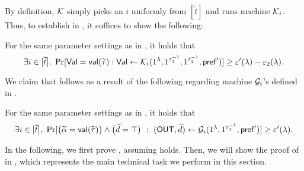 By definition, $\mathcal{K}$ simply picks an $i$ uniformly from $[\tilde{t}]$ and runs machine $\mathcal{K}_i$. Thus, to establish  in , it suffices to show the following: 
\begin{lemma}\label{pq:lem:bound:Ki}
    For the same parameter settings as in , it holds that 
    $$\exists i \in [\widetilde{t}], ~\Pr[\mathsf{Val} = \mathsf{val}(\widetilde{\tau}) :\mathsf{Val} \gets \mathcal{K}_i{(1^\lambda, 1^{\varepsilon_1^{-1}}, 1^{\varepsilon_2^{-1}}, \mathsf{pref}')}] \ge {\varepsilon'(\lambda) - \varepsilon_2(\lambda)}.$$ 
\end{lemma}
We claim that  follows as a result of the following  regarding machine $\mathcal{G}_i$'s defined in .
\begin{lemma}\label{pq:lem:bound:Gi}
    For the same parameter settings as in , it holds that 
$$
    \exists i \in [\tilde{t}],\ \Pr[\big(\tilde{\alpha} = \msf{val}( \tilde{\tau}) \big) \wedge \big(\tilde{d} = \top\big) ~:~(\OUT,\tilde{d}) \gets \mcal{G}_i{(1^\secpar, 1^{\epsilon_1^{-1}},  \msf{pref}')}] \ge \epsilon'(\secpar).
$$
\end{lemma}
In the following, we first prove , assuming  holds. Then, we will show the proof of  in , which represents the main technical task we perform in this section.

